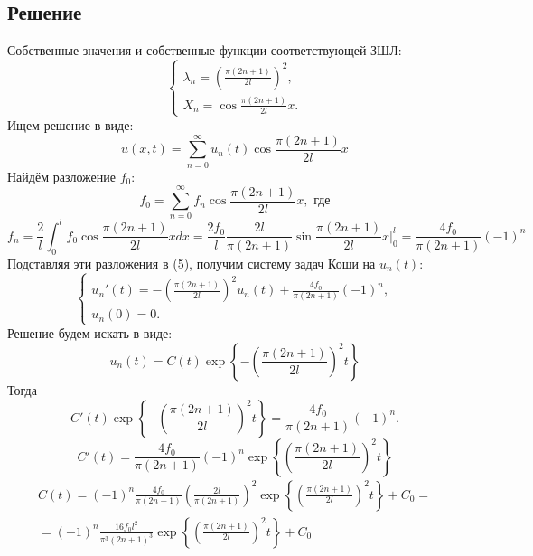 \documentclass[11pt]{article}
\begin{document}
\subsection{Решение}
\label{sec:org74fdc22}
Собственные значения и собственные функции соответствующей ЗШЛ:
\begin{equation*}
\begin{cases}
\lambda_n = \left(\frac{\pi(2n + 1)}{2l}\right)^2, \\
X_n = \cos\frac{\pi(2n + 1)}{2l}x.
\end{cases}
\end{equation*}
Ищем решение в виде:
\begin{equation*}
u(x, t) = \sum_{n = 0}^{\infty}u_n(t)\cos\frac{\pi(2n + 1)}{2l}x
\end{equation*}
Найдём разложение $f_0$:
\begin{equation*}
f_0 = \sum_{n = 0}^{\infty}f_n\cos\frac{\pi(2n + 1)}{2l}x, \text{ где}
\end{equation*}
\begin{equation*}
f_n = \frac2l\int_0^lf_0\cos\frac{\pi(2n + 1)}{2l}xdx =
\frac{2f_0}{l}\frac{2l}{\pi(2n + 1)}\sin\frac{\pi(2n + 1)}{2l}x\bigg|_0^l =
\frac{4f_0}{\pi(2n + 1)}(-1)^n
\end{equation*}
Подставляя эти разложения в (5), получим систему задач Коши на $u_n(t)$:
\begin{equation}
\begin{cases}
u_n'(t) = -\left(\frac{\pi(2n + 1)}{2l}\right)^2u_n(t) + \frac{4f_0}{\pi(2n + 1)}(-1)^n, \\
u_n(0) = 0.
\end{cases}
\end{equation}
Решение будем искать в виде:
\begin{equation*}
u_n(t) = C(t)\exp\left\{-\left(\frac{\pi(2n + 1)}{2l}\right)^2t\right\}
\end{equation*}
Тогда
\begin{equation*}
C'(t)\exp\left\{-\left(\frac{\pi(2n + 1)}{2l}\right)^2t\right\} = \frac{4f_0}{\pi(2n + 1)}(-1)^n.
\end{equation*}
\begin{equation*}
C'(t) = \frac{4f_0}{\pi(2n + 1)}(-1)^n\exp\left\{\left(\frac{\pi(2n + 1)}{2l}\right)^2t\right\}
\end{equation*}
\begin{multline*}
C(t) = (-1)^n\frac{4f_0}{\pi(2n + 1)}\left(\frac{2l}{\pi(2n + 1)}\right)^2\exp\left\{\left(\frac{\pi(2n + 1)}{2l}\right)^2t\right\} + C_0 = \\
= (-1)^n\frac{16f_0l^2}{\pi^3(2n + 1)^3}\exp\left\{\left(\frac{\pi(2n + 1)}{2l}\right)^2t\right\} + C_0
\end{multline*}
\end{document}
